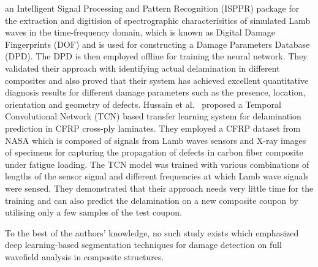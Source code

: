 an Intelligent Signal Processing and Pattern Recognition (ISPPR) package for the extraction and digitision of spectrographic characterisitics of simulated Lamb waves in the time-frequency domain, which is known as Digital Damage Fingerprints (DOF) and is used for constructing a Damage Parameters Database (DPD). The DPD is then employed offline for training the neural network. They validated their approach with identifying actual delamination in different composites and also proved that their system has achieved excellent quantitative diagnosis results for different damage parameters such as the presence, location, orientation and geometry of defects. Hussain et al.~\cite{hussaintemporal} proposed a Temporal Convolutional Network (TCN) based transfer learning system for delamination prediction in CFRP cross-ply laminates. They employed a CFRP dataset from NASA which is composed of signals from Lamb waves sensors and X-ray images of specimens for capturing the propagation of defects in carbon fiber composite under fatigue loading. The TCN model was trained with various combinations of lengths of the sensor signal and different frequencies at which Lamb wave signals were sensed. They demonstrated that their approach needs very little time for the training and can also predict the delamination on a new composite coupon by utilising only a few samples of the test coupon.        

To the best of the authors' knowledge, no such study exists which emphasized deep learning-based segmentation techniques for damage detection on full wavefield analysis in composite structures.